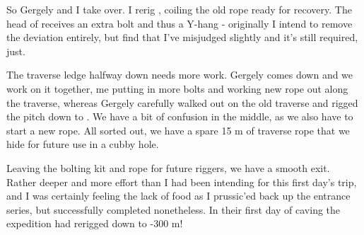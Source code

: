 So Gergely and I take over. I rerig , coiling the old rope
ready for recovery. The head of  receives an extra bolt and
thus a Y-hang - originally I intend to remove the deviation entirely, but find that I've misjudged slightly and it's still required, just.




The traverse ledge halfway down  needs more work. Gergely
comes down and we work on it together, me putting in more bolts and working new rope out along the traverse, whereas Gergely carefully
walked out on the old traverse and rigged the pitch down to . We have a bit of confusion in the middle, as we also have to start a new rope. All sorted out, we have a spare 15 m of traverse rope that we hide for future use in a cubby hole.

Leaving the bolting kit and rope for future riggers, we have a smooth exit. Rather deeper and more effort than I had been intending for this first day's trip, and I was certainly feeling the lack of food as I prussic'ed back up the entrance series, but successfully completed nonetheless. In their first day of caving the expedition had rerigged down to -300 m!



